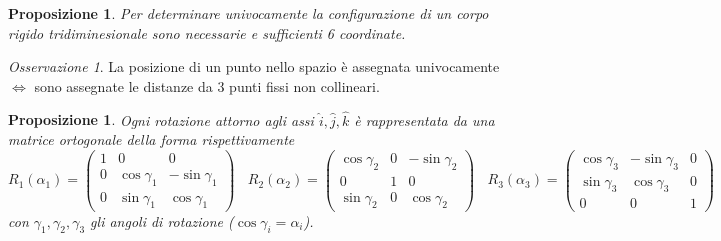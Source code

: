 \documentclass{book}
\theoremstyle{plain}
\theoremstyle{plain}
\theoremstyle{plain}
\theoremstyle{plain}
\theoremstyle{plain}
\newtheorem{prop}{Proposizione}[chapter]
\newtheorem*{prop*}{Proposizione}
\theoremstyle{definition}
\theoremstyle{remark}
\newtheorem*{oss}{Osservazione}
\theoremstyle{definition}
\begin{document}
\begin{prop}
    Per determinare univocamente la configurazione di un corpo rigido tridiminesionale sono necessarie e sufficienti 6 coordinate.
\end{prop}

\begin{oss}
    La posizione di un punto nello spazio è assegnata univocamente $\iff$ sono assegnate le distanze da 3 punti fissi non collineari.
\end{oss}

\begin{prop*}
     Ogni rotazione attorno agli assi $\hat{i}, \hat{j}, \hat{k}$ è rappresentata da una matrice ortogonale della forma rispettivamente
     \begin{displaymath}
         R_1(\alpha_1)=
         \begin{pmatrix}
            1 & 0 & 0 \\
            0 & \cos{\gamma_1} & -\sin{\gamma_1} \\
            0 & \sin{\gamma_1} & \cos{\gamma_1}
         \end{pmatrix} \ \ \ \
         R_2(\alpha_2)=
         \begin{pmatrix}
            \cos{\gamma_2} & 0 & -\sin{\gamma_2} \\
            0 & 1 & 0 \\
            \sin{\gamma_2} & 0 & \cos{\gamma_2}
         \end{pmatrix} \ \ \ \
         R_3(\alpha_3)=
         \begin{pmatrix}
            \cos{\gamma_3} & -\sin{\gamma_3} & 0 \\
            \sin{\gamma_3} & \cos{\gamma_3} & 0 \\
            0 & 0 & 1
         \end{pmatrix}
     \end{displaymath}
     con $\gamma_1, \gamma_2, \gamma_3$ gli angoli di rotazione ($\cos{\gamma_i}=\alpha_i$).
\end{prop*}
\end{document}
